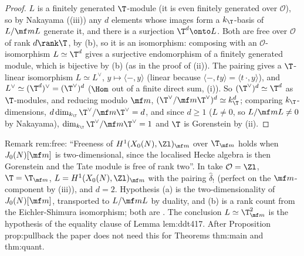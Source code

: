\begin{proof}
$L$ is a finitely generated $\T$-module (it is even finitely generated over $\mathcal O$), so by Nakayama ((iii)) any $d$ elements whose
images form a $k_\T$-basis of $L/\mf mL$ generate it, and there is a surjection $\T^d\onto L$. Both are free over $\mathcal O$ of rank $d\rank\T$, by (b), so it is an
isomorphism: composing with an $\mathcal O$-isomorphism $L\simeq\T^d$ gives a surjective endomorphism of a finitely generated module, which is bijective by
(b) (as in the proof of (ii)). The pairing gives a $\T$-linear isomorphism $L\simeq L^\vee$, $y\mapsto\langle-,y\rangle$ (linear because
$\langle-,ty\rangle=\langle t\,\cdot,y\rangle$), and $L^\vee\simeq(\T^d)^\vee=(\T^\vee)^d$ ($\Hom$ out of a finite direct sum, (i)). So $(\T^\vee)^d\simeq\T^d$
as $\T$-modules, and reducing modulo $\mf m$, $(\T^\vee/\mf m\T^\vee)^d\simeq k_\T^d$; comparing $k_\T$-dimensions, $d\dim_{k_\T}\T^\vee/\mf m\T^\vee=d$, and since $d\ge1$
($L\ne0$, so $L/\mf mL\ne0$ by Nakayama), $\dim_{k_\T}\T^\vee/\mf m\T^\vee=1$ and $\T$ is Gorenstein by (ii).
\end{proof}

\begin{paperlink}\label{pl:modules:free}
Remark rem:free: ``Freeness of $H^1(X_0(N),\Zl)_{\mf m}$ over $\T_{\mf m}$ holds when $J_0(N)[\mf m]$ is two-dimensional, since the localised Hecke algebra is then Gorenstein and the
Tate module is free of rank two''. In  take $\mathcal O=\Zl$, $\T=\T_{\mf m}$, $L=H^1(X_0(N),\Zl)_{\mf m}$ with the pairing $\hat\delta_!$ (perfect on the
$\mf m$-component by (iii)), and $d=2$. Hypothesis (a) is the two-dimensionality of $J_0(N)[\mf m]$, transported to $L/\mf mL$ by duality, and (b) is a
rank count from the Eichler-Shimura isomorphism; both are . The conclusion $L\simeq\T_{\mf m}^2$ is the hypothesis of the equality clause of Lemma
lem:ddt417. After Proposition prop:pullback the paper does not need this for Theorems thm:main and thm:quant.
\end{paperlink}

